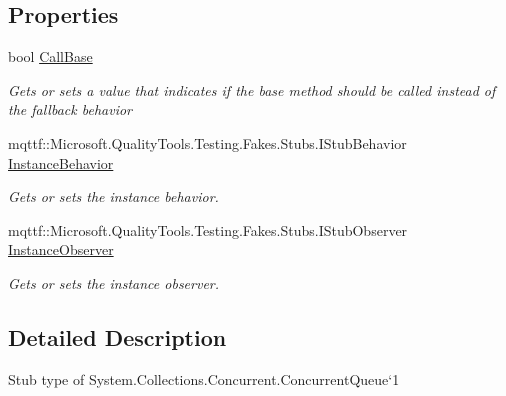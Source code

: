 \subsection*{Properties}
\begin{DoxyCompactItemize}
\item 
bool \hyperlink{class_system_1_1_collections_1_1_concurrent_1_1_fakes_1_1_stub_concurrent_queue_3_01_t_01_4_a7e62251bc9f1e0b549031be71bba672d}{Call\-Base}
\begin{DoxyCompactList}\small\item\em Gets or sets a value that indicates if the base method should be called instead of the fallback behavior\end{DoxyCompactList}\item 
mqttf\-::\-Microsoft.\-Quality\-Tools.\-Testing.\-Fakes.\-Stubs.\-I\-Stub\-Behavior \hyperlink{class_system_1_1_collections_1_1_concurrent_1_1_fakes_1_1_stub_concurrent_queue_3_01_t_01_4_a2f68550133215c3a6ef97ec4d91e50b4}{Instance\-Behavior}
\begin{DoxyCompactList}\small\item\em Gets or sets the instance behavior.\end{DoxyCompactList}\item 
mqttf\-::\-Microsoft.\-Quality\-Tools.\-Testing.\-Fakes.\-Stubs.\-I\-Stub\-Observer \hyperlink{class_system_1_1_collections_1_1_concurrent_1_1_fakes_1_1_stub_concurrent_queue_3_01_t_01_4_a34d1fc2fcd971d06ce4fd9787870e560}{Instance\-Observer}
\begin{DoxyCompactList}\small\item\em Gets or sets the instance observer.\end{DoxyCompactList}\end{DoxyCompactItemize}


\subsection{Detailed Description}
Stub type of System.\-Collections.\-Concurrent.\-Concurrent\-Queue`1



